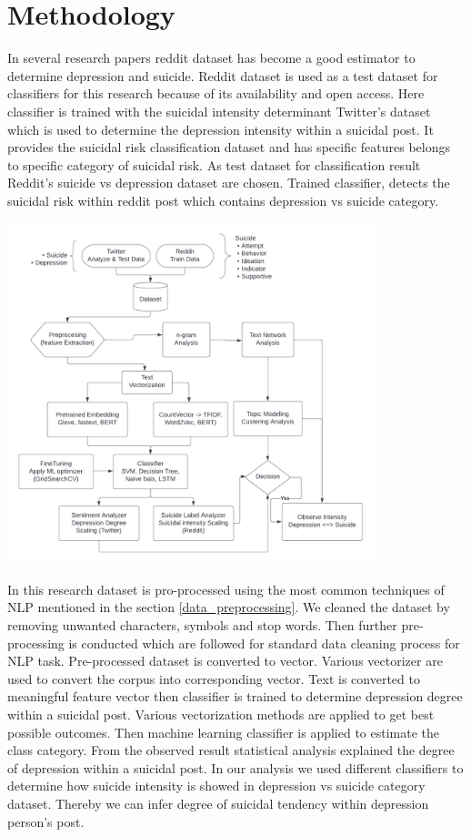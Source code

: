 \documentclass[sn-mathphys,Numbered]{sn-jnl}%
\theoremstyle{thmstyleone}%
\theoremstyle{thmstyletwo}%
\theoremstyle{thmstylethree}%
\begin{document}
  
\section{Methodology}\label{sec2}
In several research papers reddit dataset has become a good estimator to determine depression and suicide. Reddit dataset is used as a test dataset for classifiers for this research because of its availability and open access. Here classifier is trained with the suicidal intensity determinant Twitter's dataset which is used to determine the depression intensity within a suicidal post. It  provides the suicidal risk classification dataset and has specific features belongs to specific category of suicidal risk. As test dataset for classification result Reddit's suicide vs depression dataset are chosen. Trained classifier, detects the suicidal risk within reddit post which contains depression vs suicide category. 

\begin{adjustbox}{center, nofloat=figure, vspace=\bigskipamount, caption={Methodology}, label{fig:res_diagram}}
\includegraphics[width=0.8\textwidth]{res_diagram.png}
\end{adjustbox}

In this research dataset is pro-processed using the most common techniques of NLP mentioned in the section \ref{data_preprocessing}. We cleaned the dataset by removing unwanted characters, symbols and stop words. Then further pre-processing is conducted which are followed for standard data cleaning process for NLP task. Pre-processed dataset is converted to vector. Various vectorizer are used to convert the corpus into corresponding vector. Text is converted to meaningful feature vector then classifier is trained to determine depression degree within a suicidal post. Various vectorization methods are applied to get best possible outcomes. Then machine learning classifier is applied to estimate the class category. From the observed result statistical analysis explained the degree of depression within a suicidal post. In our analysis we used different classifiers to determine how suicide intensity is showed in depression vs suicide category dataset. Thereby we can infer degree of suicidal tendency within depression person's post. 
\end{document}
